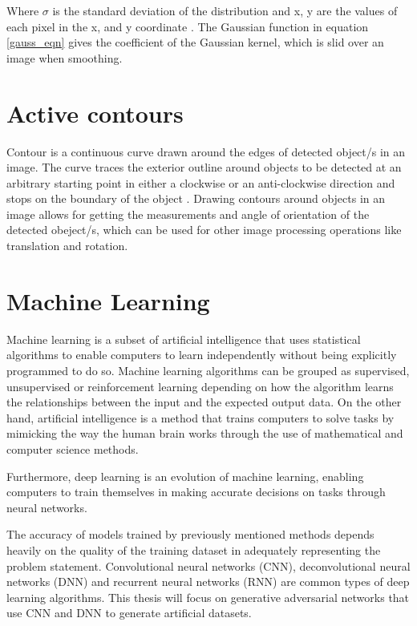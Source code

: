 Where $\sigma$ is the standard deviation of the distribution and x, y are the values of each pixel in the x, and y coordinate \cite{hsiao2007generic}. The Gaussian function in equation \ref{gauss_eqn} gives the coefficient of the Gaussian kernel, which is slid over an image when smoothing.

\section{Active contours}
Contour is a continuous curve drawn around the edges of detected object/s in an image. The curve traces the exterior outline around objects to be detected at an arbitrary starting point in either a clockwise or an anti-clockwise direction and stops on the boundary of the object \cite{waldchen2018plant}.  Drawing contours around objects in an image allows for getting the measurements and angle of orientation of the detected obeject/s, which can be used for other image processing operations like translation and rotation. 




\section{Machine Learning}

Machine learning is a subset of artificial intelligence that uses statistical algorithms to enable computers to learn independently without being explicitly programmed to do so. Machine learning algorithms can be grouped as supervised, unsupervised or reinforcement learning depending on how the algorithm learns the relationships between the input and the expected output data. On the other hand, artificial intelligence is a method that trains computers to solve tasks by mimicking the way the human brain works through the use of mathematical and computer science methods.

Furthermore, deep learning is an evolution of machine learning, enabling computers to train themselves in making accurate decisions on tasks through neural networks. 

The accuracy of models trained by previously mentioned methods depends heavily on the quality of the training dataset in adequately representing the problem statement. Convolutional neural networks (CNN), deconvolutional neural networks (DNN) and recurrent neural networks (RNN) are common types of deep learning algorithms. This thesis will focus on generative adversarial networks that use CNN and DNN to generate artificial datasets. 

